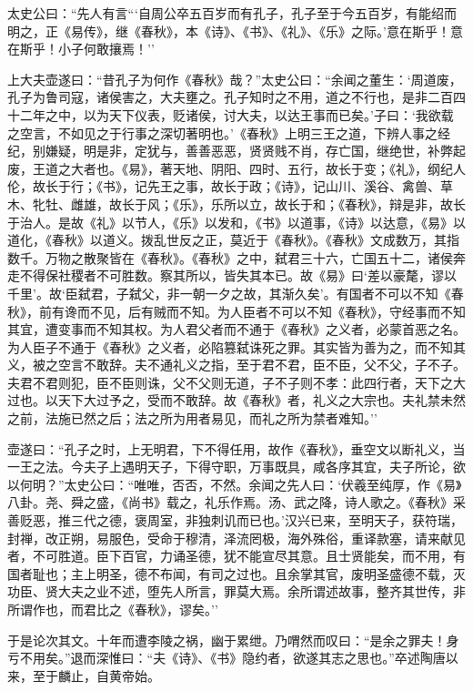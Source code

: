 \documentclass[]{article}
\begin{document}
太史公曰：``先人有言```自周公卒五百岁而有孔子，孔子至于今五百岁，有能绍而明之，正《易传》，继《春秋》，本《诗》、《书》、《礼》、《乐》之际。'意在斯乎！意在斯乎！小子何敢攘焉！''

上大夫壶遂曰：``昔孔子为何作《春秋》哉？''太史公曰：``余闻之董生：`周道废，孔子为鲁司寇，诸侯害之，大夫壅之。孔子知时之不用，道之不行也，是非二百四十二年之中，以为天下仪表，贬诸侯，讨大夫，以达王事而已矣。'子曰：`我欲载之空言，不如见之于行事之深切著明也。'《春秋》上明三王之道，下辨人事之经纪，别嫌疑，明是非，定犹与，善善恶恶，贤贤贱不肖，存亡国，继绝世，补弊起废，王道之大者也。《易》，著天地、阴阳、四时、五行，故长于变；《礼》，纲纪人伦，故长于行；《书》，记先王之事，故长于政；《诗》，记山川、溪谷、禽兽、草木、牝牡、雌雄，故长于风；《乐》，乐所以立，故长于和；《春秋》，辩是非，故长于治人。是故《礼》以节人，《乐》以发和，《书》以道事，《诗》以达意，《易》以道化，《春秋》以道义。拨乱世反之正，莫近于《春秋》。《春秋》文成数万，其指数千。万物之散聚皆在《春秋》。《春秋》之中，弑君三十六，亡国五十二，诸侯奔走不得保社稷者不可胜数。察其所以，皆失其本已。故《易》曰`差以豪氂，谬以千里'。故`臣弑君，子弑父，非一朝一夕之故，其渐久矣'。有国者不可以不知《春秋》，前有谗而不见，后有贼而不知。为人臣者不可以不知《春秋》，守经事而不知其宜，遭变事而不知其权。为人君父者而不通于《春秋》之义者，必蒙首恶之名。为人臣子不通于《春秋》之义者，必陷篡弑诛死之罪。其实皆为善为之，而不知其义，被之空言不敢辞。夫不通礼义之指，至于君不君，臣不臣，父不父，子不子。夫君不君则犯，臣不臣则诛，父不父则无道，子不子则不孝：此四行者，天下之大过也。以天下大过予之，受而不敢辞。故《春秋》者，礼义之大宗也。夫礼禁未然之前，法施已然之后；法之所为用者易见，而礼之所为禁者难知。''

壶遂曰：``孔子之时，上无明君，下不得任用，故作《春秋》，垂空文以断礼义，当一王之法。今夫子上遇明天子，下得守职，万事既具，咸各序其宜，夫子所论，欲以何明？''太史公曰：``唯唯，否否，不然。余闻之先人曰：`伏羲至纯厚，作《易》八卦。尧、舜之盛，《尚书》载之，礼乐作焉。汤、武之降，诗人歌之。《春秋》采善贬恶，推三代之德，褒周室，非独刺讥而已也。'汉兴已来，至明天子，获符瑞，封禅，改正朔，易服色，受命于穆清，泽流罔极，海外殊俗，重译款塞，请来献见者，不可胜道。臣下百官，力诵圣德，犹不能宣尽其意。且士贤能矣，而不用，有国者耻也；主上明圣，德不布闻，有司之过也。且余掌其官，废明圣盛德不载，灭功臣、贤大夫之业不述，堕先人所言，罪莫大焉。余所谓述故事，整齐其世传，非所谓作也，而君比之《春秋》，谬矣。''

于是论次其文。十年而遭李陵之祸，幽于累绁。乃喟然而叹曰：``是余之罪夫！身亏不用矣。''退而深惟曰：``夫《诗》、《书》隐约者，欲遂其志之思也。''卒述陶唐以来，至于麟止，自黄帝始。
\end{document}
